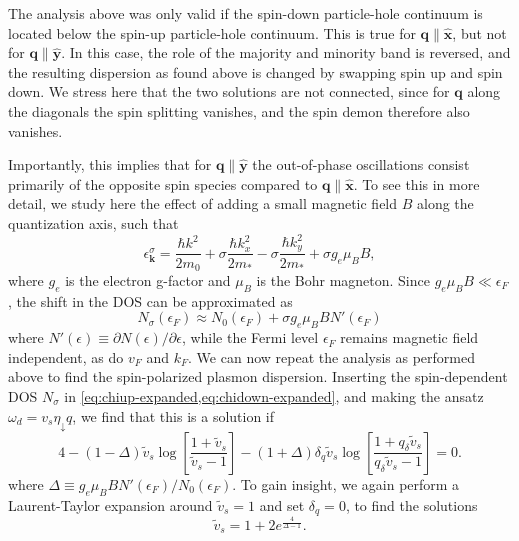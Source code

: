 \documentclass[aps,prb,reprint,twocolumns,superscriptaddress,nofootinbib]{revtex4-2}
\newcommand{\xx}{\hat{\bm{x}}}
\newcommand{\yy}{\hat{\bm{y}}}
\newcommand{\kF}{k_{F}}
\begin{document}
	
	The analysis above was only valid if the spin-down particle-hole continuum is located below the spin-up particle-hole continuum. This is true for $\bm q\parallel \xx$, but not for $\bm q\parallel \yy$. In this case, the role of the majority and minority band is reversed, and the resulting dispersion as found above is changed by swapping spin up and spin down. We stress here that the two solutions are not connected, since for $\bm q$ along the diagonals the spin splitting vanishes, and the spin demon therefore also vanishes.
	
	Importantly, this implies that for $\bm q \parallel \yy$ the out-of-phase oscillations consist primarily of the opposite spin species compared to $\bm q\parallel\xx$. To see this in more detail, we study here the effect of adding a small magnetic field $B$ along the quantization axis, such that 
	\begin{equation}
		\epsilon_{\bm k}^\sigma = \frac{\hbar k^2}{2m_0} + \sigma \frac{\hbar k_x^2}{2m_*} - \sigma \frac{\hbar k_y^2}{2m_*} + \sigma g_e\mu_B B,
	\end{equation}
	where $g_e$ is the electron g-factor and $\mu_B$ is the Bohr magneton.  Since $g_e\mu_B B\ll\epsilon_F$, the shift in the DOS can be approximated as \cite{ashcroftSolidStatePhysics1976}
	\begin{equation}
		N_\sigma(\epsilon_F)\approx N_0(\epsilon_F) +\sigma g_e\mu_B B N'(\epsilon_F) 
	\end{equation}
	where $N'(\epsilon)\equiv\partial  N(\epsilon)/\partial\epsilon$,
	while the Fermi level $\epsilon_F$ remains magnetic field independent, as do $v_F$ and $\kF$. We can now repeat the analysis as performed above to find the spin-polarized plasmon dispersion. Inserting the spin-dependent DOS $N_\sigma$ in \cref{eq:chiup-expanded,eq:chidown-expanded}, and making the ansatz $\omega_d=v_s \eta_\downarrow q$, we find that this is a solution if
	\begin{equation}
		4-(1-\Delta)\tilde v_s\log \left[ \frac{1+\tilde v_s}{\tilde v_s-1}\right] -(1+\Delta) \delta_q \tilde v_s \log \left[ \frac{1+q_\delta\tilde v_s}{q_\delta\tilde v_s-1}\right] = 0.
	\end{equation} 
	where $\Delta\equiv g_e\mu_B B N'(\epsilon_F) /N_0(\epsilon_F) $. To gain insight, we again perform a Laurent-Taylor expansion around $\tilde v_s=1$ and set $\delta_q=0$, to find the solutions
	\begin{equation}
		\tilde v_s = 1 + 2 e^{\frac{4}{\Delta-1}}.
	\end{equation}
\end{document}
